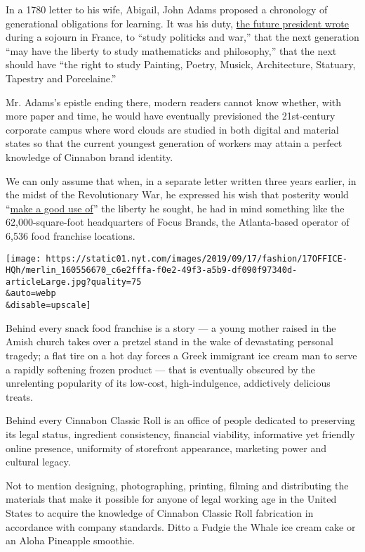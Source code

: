 In a 1780 letter to his wife, Abigail, John Adams proposed a chronology
of generational obligations for learning. It was his duty,
\href{https://www.masshist.org/digitaladams/archive/doc?id=L17800512jasecond}{the
future president wrote} during a sojourn in France, to ``study politicks
and war,'' that the next generation ``may have the liberty to study
mathematicks and philosophy,'' that the next should have ``the right to
study Painting, Poetry, Musick, Architecture, Statuary, Tapestry and
Porcelaine.''

Mr. Adams's epistle ending there, modern readers cannot know whether,
with more paper and time, he would have eventually previsioned the
21st-century corporate campus where word clouds are studied in both
digital and material states so that the current youngest generation of
workers may attain a perfect knowledge of Cinnabon brand identity.

We can only assume that when, in a separate letter written three years
earlier, in the midst of the Revolutionary War, he expressed his wish
that posterity would
``\href{https://www.masshist.org/digitaladams/archive/doc?id=L17770426ja}{make
a good use of}'' the liberty he sought, he had in mind something like
the 62,000-square-foot headquarters of Focus Brands, the Atlanta-based
operator of 6,536 food franchise locations.

\texttt{[image: https://static01.nyt.com/images/2019/09/17/fashion/17OFFICE-HQh/merlin\_160556670\_c6e2fffa-f0e2-49f3-a5b9-df090f97340d-articleLarge.jpg?quality=75\\\&auto=webp\\\&disable=upscale]}

Behind every snack food franchise is a story --- a young mother raised
in the Amish church takes over a pretzel stand in the wake of
devastating personal tragedy; a flat tire on a hot day forces a Greek
immigrant ice cream man to serve a rapidly softening frozen product ---
that is eventually obscured by the unrelenting popularity of its
low-cost, high-indulgence, addictively delicious treats.

Behind every Cinnabon Classic Roll is an office of people dedicated to
preserving its legal status, ingredient consistency, financial
viability, informative yet friendly online presence, uniformity of
storefront appearance, marketing power and cultural legacy.

Not to mention designing, photographing, printing, filming and
distributing the materials that make it possible for anyone of legal
working age in the United States to acquire the knowledge of Cinnabon
Classic Roll fabrication in accordance with company standards. Ditto a
Fudgie the Whale ice cream cake or an Aloha Pineapple smoothie.

